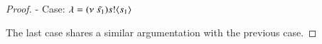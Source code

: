 \begin{proof}
	\noi - Case: $\lambda = (\nu\ \tilde{s_1}) s ! \langle s_1 \rangle$

	The last case shares a similar argumentation with the previous case.
	
\begin{comment}
	The statement $\wb \subseteq \wbc$.
	is equivalent to the statement $\forall n, \wb_n \subseteq \wbc_n$.
	The proof is done using induction on the definition $\wb$.

	\noi {\bf Basic step:} From the definitions of $\wbc_0$ and $\wb_0$ we get that $\wbc_0 = \wb_0$.

	\noi {\bf Induction hypothesis:} $\wb_n \subseteq \wbc_n$.

	\noi {\bf Inductive step:}
	Let 
	\[
		\Gamma; \emptyset; \Sigma_1\ \wb_{n+1}\ \Sigma_2 \proves P_1\ \wb_{n+1}\ Q_1
	\]
	We perform a case analysis on transition $\by{\lambda}$.

	\noi - Case: $\lambda \notin \set{\news{\tilde{s}} \bactout{s}{\abs{x} P}, \news{\tilde{s}} \bactout{s}{s_1}}$

	\noi Same arguments with the same case of the direction $\wbc \subseteq \wb$


	\noi - Case: $\lambda = \news{\tilde{s}} \bactout{s}{\abs{x} P}$
%
	\begin{eqnarray}
		\Gamma; \emptyset; \Sigma_1 \by{\news{\tilde{s}} \bactout{s}{\abs{x} P}} \Sigma_1' \proves P_1 \by{\news{\tilde{s}} \bactout{s}{\abs{x} P}} P_2 \label{lem:wb_is_wbc1}
	\end{eqnarray}
%
	\noi implies that
	$\exists Q_2, \abs{x}{Q}$ such that
	\begin{eqnarray}
		\Gamma; \emptyset; \Sigma_2 \By{\news{\tilde{s'}} \bactout{s}{\abs{x} Q}} \Sigma_2' \proves Q_1 \By{\news{\tilde{s'}} \bactout{s}{\abs{x} Q}} Q_2 \label{lem:wb_is_wbc2}
	\end{eqnarray}
%
	\noi and $\forall s'$
	\begin{eqnarray*}
		\Gamma; \emptyset; \Sigma_1''\ \wb_{n}\ \Sigma_2'' \proves \newsp{\tilde{s}}{P' \Par P \subst{s'}{x}}\ \wb_{n}\ 
		\newsp{\tilde{s'}}{Q' \Par Q \subst{s'}{x}}
	\end{eqnarray*}
%
	\noi Set
%
	\begin{eqnarray*}
		\mathcal{R}_{n + 1} &=& \set{	(\Gamma; \emptyset; \Sigma_1 \proves \newsp{\tilde{s}}{\bout{s}{\abs{x}{R \subst{(x) P}{X}}} P_2} \hastype \Proc,
						\Gamma; \emptyset; \Sigma_2 \proves \newsp{\tilde{s'}}{\bout{s}{\abs{x}{R \subst{(x) Q}{X}}} Q_2} \hastype \Proc) \setbar
						\forall R, \set{X} = \fpv{R}}
	\end{eqnarray*}
%
	\dk{prove that $R_{n+1}$ is typable}


\end{comment}
\end{proof}
